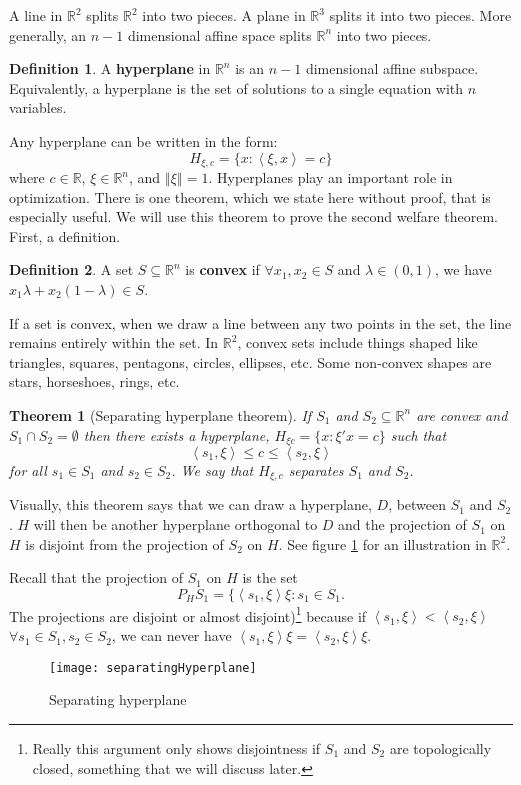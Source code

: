 \documentclass[12pt,reqno]{amsart}
\newtheorem{theorem}{Theorem}[section]
\theoremstyle{definition}
\newtheorem{definition}{Definition}[section]
\def\R{\mathbb{R}}
\newcommand{\iprod}[2]{\left\langle {#1} , {#2} \right\rangle}
\newcommand{\norm}[1]{\left\Vert {#1} \right\Vert}
\begin{document}
A line in $\R^2$ splits $\R^2$ into two pieces. A plane in $\R^3$
splits it into two pieces. More generally, an $n-1$ dimensional
affine space splits $\R^n$ into two pieces.
\begin{definition}
  A \textbf{hyperplane} in $\R^n$ is an $n-1$ dimensional affine
  subspace. Equivalently, a hyperplane is the set of solutions to a
  single equation with $n$ variables.
\end{definition}
Any hyperplane can be written in the form:
\[ H_{\xi,c} = \{x: \iprod{\xi}{x} = c \} \] where $c \in \R$, $\xi \in
\R^n$, and $\norm{\xi} = 1$.  Hyperplanes play an important role in
optimization. There is one theorem, which we state here without proof,
that is especially useful.  We will use this theorem to prove the
second welfare theorem. First, a definition.
\begin{definition}
  A set $S \subseteq \R^n$ is \textbf{convex} if $\forall x_1, x_2 \in
  S$ and $\lambda \in (0,1)$, we have $x_1 \lambda + x_2(1-\lambda)
  \in S$.
\end{definition}
If a set is convex, when we draw a line between any two points in the
set, the line remains entirely within the set.  In $\R^2$, convex sets
include things shaped like triangles, squares, pentagons, circles,
ellipses, etc. Some non-convex shapes are stars, horseshoes, rings,
etc.

\begin{theorem}[Separating hyperplane theorem] \label{thm:sht}
  If $S_1$ and $S_2 \subseteq \R^n$ are convex and $S_1 \cap S_2 =
  \emptyset$ then there exists a hyperplane, $H_{\xi c} = \{ x: \xi'x
  = c \}$ such that  
  \[ \iprod{s_1}{\xi} \leq c \leq \iprod{s_2}{\xi} \]
  for all $s_1 \in S_1$ and $s_2 \in S_2$. We say that $H_{\xi,c}$
  separates $S_1$ and $S_2$. 
\end{theorem}
Visually, this theorem says that we can draw a hyperplane, $D$,
between $S_1$ and $S_2$. $H$ will then be another hyperplane
orthogonal to $D$ and the projection of $S_1$ on $H$ is disjoint from
the projection of $S_2$ on $H$. See figure \ref{fig:sht} for an
illustration in $\R^2$.

Recall that the projection of $S_1$ on $H$ is the set
\[ P_H S_1 = \{ \iprod{s_1}{\xi}\xi : s_1 \in S_1. \] The projections
are disjoint or almost disjoint)\footnote{Really this argument only
  shows disjointness if $S_1$ and $S_2$ are topologically
  closed, something that we will discuss later.} because if
$\iprod{s_1}{\xi} < \iprod{s_2}{\xi}$ $\forall s_1 \in S_1, s_2 \in
S_2$, we can never have $\iprod{s_1}{\xi}\xi = \iprod{s_2}{\xi}\xi $.
\begin{figure}\caption{Separating hyperplane \label{fig:sht}}
  \begin{centering}
    \texttt{[image: separatingHyperplane]}
  \end{centering}
\end{figure}
\end{document}
